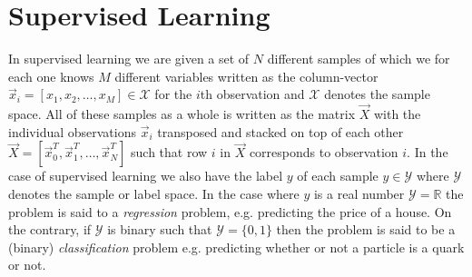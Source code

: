 \section{Supervised Learning}
\label{sec:ml:supervised_learning}
In supervised learning we are given a set of $N$ different samples of which we for each one knows $M$ different variables written as the column-vector $\vec{x}_i = [x_1, x_2, \dots, x_M] \in \mathcal{X}$ for the $i$th observation and $\mathcal{X}$ denotes the sample space. All of these samples as a whole is written as the matrix $\vec{X}$ with the individual observations $\vec{x}_i$ transposed and stacked on top of each other $\vec{X} = [\vec{x}_0^T, \vec{x}_1^T, \dots, \vec{x}_N^T]$ such that row $i$ in $\vec{X}$ corresponds to observation $i$. In the case of supervised learning we also have the label $y$ of each sample $y \in \mathcal{Y}$ where $\mathcal{Y}$ denotes the sample or label space. 
In the case where $y$ is a real number $\mathcal{Y} = \mathbb{R}$ the problem is said to a \emph{regression} problem, e.g. predicting the price of a house. On the contrary, if $\mathcal{Y}$ is binary such that $\mathcal{Y} = \{0, 1\}$ then the problem is said to be a (binary) \emph{classification} problem e.g. predicting whether or not a particle is a quark or not. 

